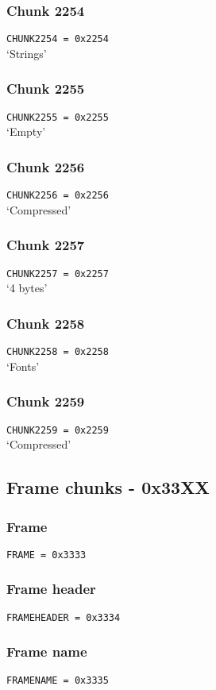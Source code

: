 \documentclass{article}
\begin{document}
\subsubsection{Chunk 2254}
\verb|CHUNK2254 = 0x2254|
\\
`Strings'

\subsubsection{Chunk 2255}
\verb|CHUNK2255 = 0x2255|
\\
`Empty'

\subsubsection{Chunk 2256}
\verb|CHUNK2256 = 0x2256|
\\
`Compressed'

\subsubsection{Chunk 2257}
\verb|CHUNK2257 = 0x2257|
\\
`4 bytes'

\subsubsection{Chunk 2258}
\verb|CHUNK2258 = 0x2258|
\\
`Fonts'

\subsubsection{Chunk 2259}
\verb|CHUNK2259 = 0x2259|
\\
`Compressed'

\subsection{Frame chunks - 0x33XX}

\subsubsection{Frame}
\verb|FRAME = 0x3333|

\subsubsection{Frame header}
\verb|FRAMEHEADER = 0x3334|

\subsubsection{Frame name}
\verb|FRAMENAME = 0x3335|
\end{document}
